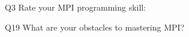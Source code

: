 \begin{description}%
\item{Q3} Rate your MPI programming skill:%
\item{Q19} What are your obstacles to mastering MPI?%
\end{description}%
